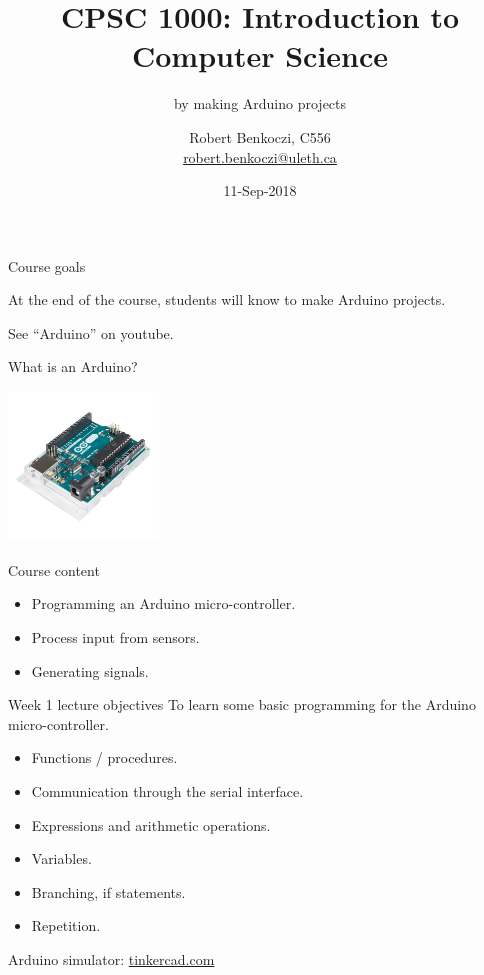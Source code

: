 \documentclass[aspectratio=1610]{beamer}
\title %
{CPSC 1000: Introduction to Computer Science}
\subtitle{by making Arduino projects} %
\author{Robert Benkoczi, C556\\\url{robert.benkoczi@uleth.ca}}
\date{11-Sep-2018}
\begin{document}
\begin{frame}[plain]
\titlepage
\end{frame}



\begin{frame}[t,plain]{Course goals}

  At the end of the course, students will know to make Arduino projects.

  \smallskip
  See ``Arduino'' on youtube.

\end{frame}



\begin{frame}[t,plain]{What is an Arduino?}

\hfill\includegraphics[width=0.3\textwidth]{figs/1-arduino.jpg}

\end{frame}


\begin{frame}[t,plain]{Course content}

\begin{itemize}
\item Programming an Arduino micro-controller.
\item Process input from sensors.
\item Generating signals.
\end{itemize}

\end{frame}



\begin{frame}[t,plain]{Week 1 lecture objectives}
To learn some basic programming for the Arduino micro-controller. 
\begin{itemize}
\item Functions / procedures.
\item Communication through the serial interface.
\item Expressions and arithmetic operations.
\item Variables.
\item Branching, if statements.
\item Repetition.
\end{itemize}

\smallskip
Arduino simulator:
\url{tinkercad.com}
\end{frame}
\end{document}
